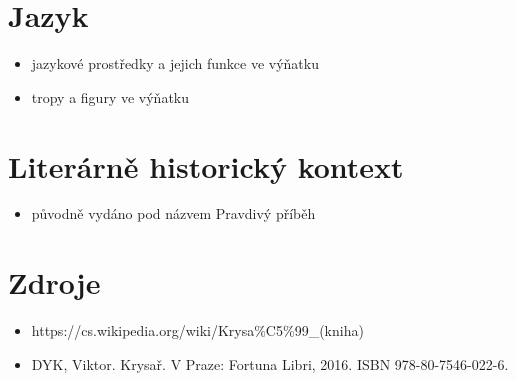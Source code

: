 \documentclass[10pt,a4paper]{article}
\begin{document}
\section*{Jazyk}
\begin{itemize}
\item jazykové prostředky a jejich funkce ve výňatku
\item tropy a figury ve výňatku
\end{itemize}
\section*{Literárně historický kontext}
\begin{itemize}
\item původně vydáno pod názvem Pravdivý příběh
\end{itemize}
\section*{Zdroje}
\begin{itemize}
\item https://cs.wikipedia.org/wiki/Krysa\%C5\%99\_(kniha)
\item DYK, Viktor. Krysař. V Praze: Fortuna Libri, 2016. ISBN 978-80-7546-022-6.
\end{itemize}
\end{document}
